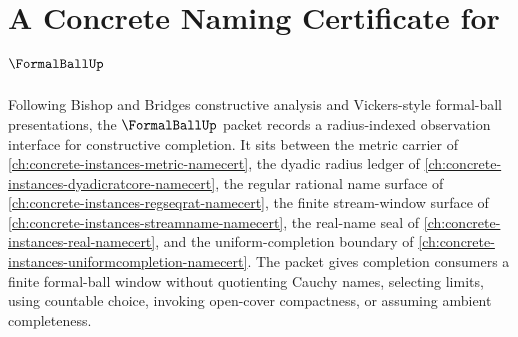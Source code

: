 \chapter{A Concrete Naming Certificate for $\FormalBallUp$}
\label{ch:concrete-instances-formalball-namecert}

Following Bishop and Bridges constructive analysis and Vickers-style formal-ball presentations, the $\FormalBallUp$ packet records a radius-indexed observation interface for constructive completion. It sits between the metric carrier of \autoref{ch:concrete-instances-metric-namecert}, the dyadic radius ledger of \autoref{ch:concrete-instances-dyadicratcore-namecert}, the regular rational name surface of \autoref{ch:concrete-instances-regseqrat-namecert}, the finite stream-window surface of \autoref{ch:concrete-instances-streamname-namecert}, the real-name seal of \autoref{ch:concrete-instances-real-namecert}, and the uniform-completion boundary of \autoref{ch:concrete-instances-uniformcompletion-namecert}. The packet gives completion consumers a finite formal-ball window without quotienting Cauchy names, selecting limits, using countable choice, invoking open-cover compactness, or assuming ambient completeness.

